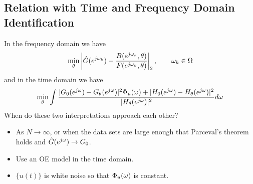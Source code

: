 \subsection{Relation with Time and Frequency Domain Identification}
In the frequency domain we have
\begin{align*}
\min_\theta\left|\hat{G}(e^{j\omega_k}) - \frac{B(e^{j\omega_k},\theta)}{F(e^{j\omega_k},\theta)}\right|_2, \qquad \omega_k\in\Omega
\end{align*}
and in the time domain we have
\begin{align*}
\min_\theta\int\frac{|G_0(e^{j\omega})-G_\theta(e^{j\omega})|^2\Phi_u(\omega) + |H_0(e^{j\omega})-H_\theta(e^{j\omega})|^2}{|H_\theta(e^{j\omega})|^2}d\omega
\end{align*}
When do these two interpretations approach each other?
\begin{itemize}
\item As $N\to\infty$, or when the data sets are large enough that Parceval's theorem holds and $\hat{G}(e^{j\omega})\to G_0$.
\item Use an OE model in the time domain.
\item $\{u(t)\}$ is white noise so that $\Phi_u(\omega)$ is constant.
\end{itemize}
